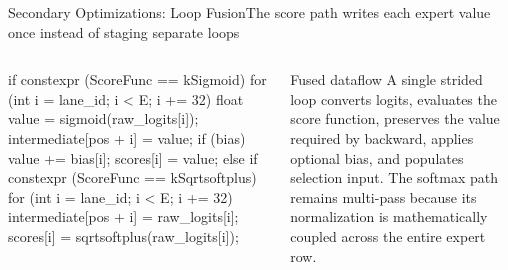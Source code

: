 \documentclass[aspectratio=169,10pt]{beamer}
\renewcommand{\NvidiaSource}[1]{}
\begin{document}
\begin{frame}[fragile]{Secondary Optimizations: Loop Fusion}{The score path writes each expert value once instead of staging separate loops}
  \NvidiaSource{TE commit \texttt{6d6005a7};
    \texttt{TE/.../fused\_router/fused\_topk\_with\_score\_function.cu}}
  \begin{columns}[T,onlytextwidth]
    \begin{column}{.58\textwidth}
      \begin{NvidiaCode}[language=NvidiaCUDA,basicstyle=\ttfamily\fontsize{6.7}{7.9}\selectfont]
if constexpr (ScoreFunc == kSigmoid) {
  for (int i = lane_id; i < E; i += 32) {
    float value = sigmoid(raw_logits[i]);
    intermediate[pos + i] = value;
    if (bias) value += bias[i];
    scores[i] = value;
  }
} else if constexpr (ScoreFunc == kSqrtsoftplus) {
  for (int i = lane_id; i < E; i += 32) {
    intermediate[pos + i] = raw_logits[i];
    scores[i] = sqrtsoftplus(raw_logits[i]);
  }
}
      \end{NvidiaCode}
    \end{column}
    \begin{column}{.37\textwidth}
      {\NvidiaSansMedium Fused dataflow}\NvidiaTightRule{.6pt}\vspace{.07in}
      \small A single strided loop converts logits, evaluates the score function, preserves the
      value required by backward, applies optional bias, and populates selection input.
      \vspace{.10in}
      \small The softmax path remains multi-pass because its normalization is mathematically
      coupled across the entire expert row.
    \end{column}
  \end{columns}
\end{frame}
\end{document}
